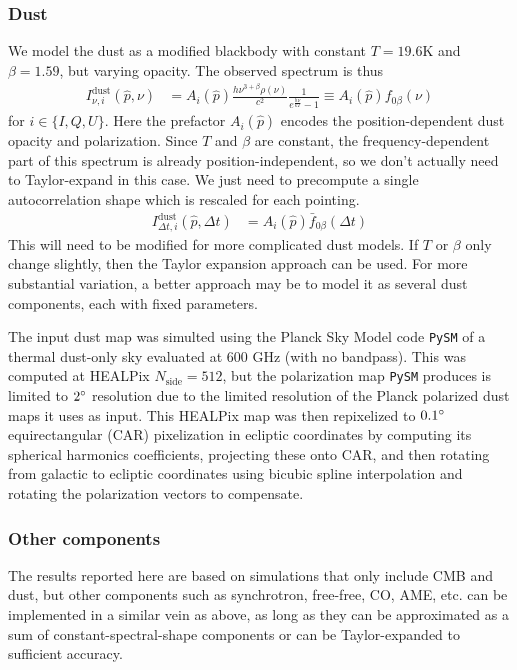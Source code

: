 \documentclass{article}
\newcommand{\code}[1]{\texttt{#1}}
\begin{document}
\subsubsection{Dust}
We model the dust as a modified blackbody with constant
$T=19.6$K and $\beta=1.59$, but varying opacity. The observed spectrum is thus
\begin{align}
I^\textrm{dust}_{\nu,i}(\hat p,\nu) &= A_i(\hat p) \frac{h\nu^{3+\beta}\rho(\nu)}{c^2}\frac{1}{e^{\frac{h\nu}{kT}}-1} \equiv A_i(\hat p) f_{0\beta}(\nu)
\end{align}
for $i \in \{I,Q,U\}$. Here the prefactor $A_i(\hat p)$ encodes the position-dependent
dust opacity and polarization.
Since $T$ and $\beta$ are constant, the frequency-dependent part of this spectrum is
already position-independent, so we don't actually need to Taylor-expand in this case.
We just need to precompute a single autocorrelation shape which is rescaled for each
pointing.
\begin{align}
I^\textrm{dust}_{\Delta t,i}(\hat p,\Delta t) &= A_i(\hat p) \bar f_{0\beta}(\Delta t)
\end{align}
This will need to be modified for more complicated dust models. If $T$ or $\beta$
only change slightly, then the Taylor expansion approach can be used. For more
substantial variation, a better approach may be to model it as several dust components,
each with fixed parameters.

The input dust map was simulted using the Planck Sky Model \cite{psm} code \code{PySM}
of a thermal dust-only sky evaluated at 600 GHz (with no bandpass).
This was computed at HEALPix $N_\textrm{side} = 512$, but the polarization
map \code{PySM} produces is limited to $2\degree$ resolution due to the limited
resolution of the Planck polarized dust maps it uses as input. This HEALPix map
was then repixelized to $0.1\degree$ equirectangular (CAR) pixelization in
ecliptic coordinates by computing its spherical harmonics coefficients,
projecting these onto CAR, and then rotating from galactic to ecliptic coordinates
using bicubic spline interpolation and rotating the polarization vectors to compensate.

\subsubsection{Other components}
The results reported here are based on simulations that only include CMB and dust,
but other components such as synchrotron, free-free, CO, AME, etc. can be implemented
in a similar vein as above, as long as they can be approximated as a sum of
constant-spectral-shape components or can be Taylor-expanded to sufficient accuracy.
\end{document}
